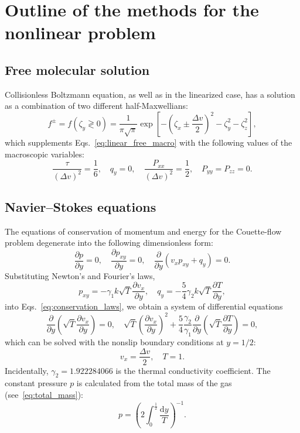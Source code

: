 \documentclass[aip,pof,preprint]{revtex4-1}
\newcommand{\dd}{\mathrm{d}}
\newcommand{\pder}[2][]{\frac{\partial#1}{\partial#2}}
\begin{document}
\section{Outline of the methods for the nonlinear problem}

\subsection{Free molecular solution}

Collisionless Boltzmann equation, as well as in the linearized case,
has a solution as a combination of two different half-Maxwellians:
\begin{equation}\label{eq:free_solution}
    f^\pm = f(\zeta_y \gtrless 0) =
        \frac1{\pi\sqrt\pi} \exp\left[-\left(\zeta_x\pm\frac{\Delta{v}}2\right)^2 - \zeta_y^2 - \zeta_z^2\right],
\end{equation}
which supplements Eqs.~\eqref{eq:linear_free_macro} with the following values of the macroscopic variables:
\begin{equation}\label{eq:free_macro}
    \frac{\tau}{(\Delta{v})^2} = \frac16, \quad q_y = 0, \quad
    \frac{P_{xx}}{(\Delta{v})^2} = \frac12, \quad P_{yy} = P_{zz} = 0.
\end{equation}

\subsection{Navier--Stokes equations}\label{sec:Navier-Stokes}

The equations of conservation of momentum and energy for the Couette-flow problem
degenerate into the following dimensionless form:
\begin{equation}\label{eq:conservation_laws}
    \pder[p]{y} = 0, \quad \pder[p_{xy}]{y} = 0, \quad \pder{y}(v_x p_{xy} + q_y) = 0.
\end{equation}
Substituting Newton's and Fourier's laws,
\begin{equation}\label{eq:Newton-Fourier}
    p_{xy} = -\gamma_1 k\sqrt{T}\pder[v_x]{y}, \quad q_y = -\frac54\gamma_2 k\sqrt{T}\pder[T]{y},
\end{equation}
into Eqs.~\eqref{eq:conservation_laws}, we obtain a system of differential equations
\begin{equation}\label{eq:Navier-Stokes}
    \pder{y}\left(\sqrt{T}\pder[v_x]{y}\right) = 0, \quad
    \sqrt{T}\left(\pder[v_x]{y}\right)^2 + \frac54\frac{\gamma_2}{\gamma_1}\pder{y}\left(\sqrt{T}\pder[T]{y}\right) = 0,
\end{equation}
which can be solved with the nonslip boundary conditions at \(y=1/2\):
\begin{equation}\label{eq:nonslip_bc}
    v_x = \frac{\Delta{v}}2, \quad T = 1.
\end{equation}
Incidentally, \(\gamma_2 = 1.922284066\) is the thermal conductivity coefficient.
The constant pressure \(p\) is calculated from the total mass of the gas (see~\eqref{eq:total_mass}):
\begin{equation}\label{eq:constant_pressure}
    p = \left( 2\int_{0}^\frac12\frac{\dd{y}}{T} \right)^{-1}.
\end{equation}
\end{document}

